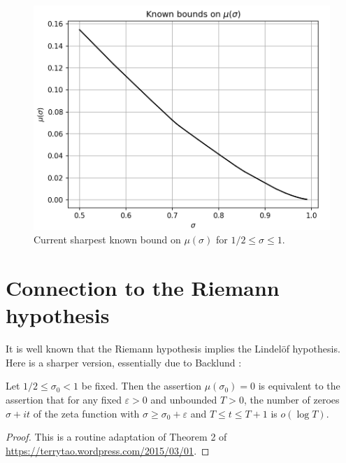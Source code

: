 \derived 
{}

\begin{figure}
    \centering
    \includegraphics[width=0.5\linewidth]{chapter/mu_bound_plot.png}
    \caption{Current sharpest known bound on $\mu(\sigma)$ for $1/2 \le \sigma \le 1$.}
    \label{fig:best_mu_bound}
\end{figure}

\section{Connection to the Riemann hypothesis}

It is well known that the Riemann hypothesis implies the Lindel\"of hypothesis.  Here is a sharper version, essentially due to Backlund \cite{backlund}:

\begin{lemma}  Let $1/2 \leq \sigma_0 < 1$ be fixed.  Then the assertion $\mu(\sigma_0)=0$ is equivalent to the assertion that for any fixed $\varepsilon>0$ and unbounded $T>0$, the number of zeroes $\sigma+it$ of the zeta function with $\sigma \geq \sigma_0+\varepsilon$ and $T \leq t \leq T+1$ is $o(\log T)$.
\end{lemma}

\begin{proof} This is a routine adaptation of Theorem 2 of \url{https://terrytao.wordpress.com/2015/03/01}.
\end{proof}
